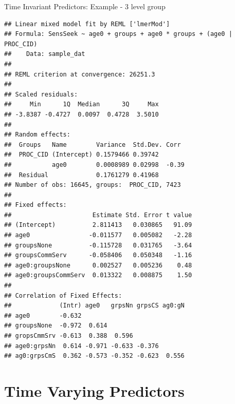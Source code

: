 \begin{frame}[fragile]{Time Invariant Predictors: Example - 3 level
group}

\small

\begin{Shaded}
\begin{Highlighting}[]
\StringTok{ }\OperatorTok{~}\StringTok{ }\OperatorTok{+}\StringTok{ }\OperatorTok{+}\StringTok{ }\OperatorTok{*}\OperatorTok{+}\StringTok{ }
\StringTok{                }\OperatorTok{|}
\end{Highlighting}
\end{Shaded}

\tiny

\begin{verbatim}
## Linear mixed model fit by REML ['lmerMod']
## Formula: SensSeek ~ age0 + groups + age0 * groups + (age0 | PROC_CID)
##    Data: sample_dat
## 
## REML criterion at convergence: 26251.3
## 
## Scaled residuals: 
##     Min      1Q  Median      3Q     Max 
## -3.8387 -0.4727  0.0097  0.4728  3.5010 
## 
## Random effects:
##  Groups   Name        Variance  Std.Dev. Corr 
##  PROC_CID (Intercept) 0.1579466 0.39742       
##           age0        0.0008989 0.02998  -0.39
##  Residual             0.1761279 0.41968       
## Number of obs: 16645, groups:  PROC_CID, 7423
## 
## Fixed effects:
##                      Estimate Std. Error t value
## (Intercept)          2.811413   0.030865   91.09
## age0                -0.011577   0.005082   -2.28
## groupsNone          -0.115728   0.031765   -3.64
## groupsCommServ      -0.058406   0.050348   -1.16
## age0:groupsNone      0.002527   0.005236    0.48
## age0:groupsCommServ  0.013322   0.008875    1.50
## 
## Correlation of Fixed Effects:
##             (Intr) age0   grpsNn grpsCS ag0:gN
## age0        -0.632                            
## groupsNone  -0.972  0.614                     
## gropsCmmSrv -0.613  0.388  0.596              
## age0:grpsNn  0.614 -0.971 -0.633 -0.376       
## ag0:grpsCmS  0.362 -0.573 -0.352 -0.623  0.556
\end{verbatim}

\normalsize

\end{frame}

\section{Time Varying Predictors}\label{time-varying-predictors}

